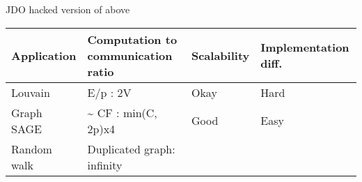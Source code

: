 \documentclass[10pt,oneside]{memoir}
\begin{document}
JDO hacked version of above

\begin{longtable}[]{@{}llll@{}}
\toprule
\begin{minipage}[b]{0.28\columnwidth}\raggedright
Application\strut
\end{minipage} & \begin{minipage}[b]{0.35\columnwidth}\raggedright
Computation to communication ratio\strut
\end{minipage} & \begin{minipage}[b]{0.13\columnwidth}\raggedright
Scalability\strut
\end{minipage} & \begin{minipage}[b]{0.13\columnwidth}\raggedright
Implementation diff.\strut
\end{minipage}\tabularnewline
\midrule
\endhead
\begin{minipage}[t]{0.28\columnwidth}\raggedright
Louvain\strut
\end{minipage} & \begin{minipage}[t]{0.35\columnwidth}\raggedright
E/p : 2V\strut
\end{minipage} & \begin{minipage}[t]{0.13\columnwidth}\raggedright
Okay\strut
\end{minipage} & \begin{minipage}[t]{0.13\columnwidth}\raggedright
Hard\strut
\end{minipage}\tabularnewline
\begin{minipage}[t]{0.28\columnwidth}\raggedright
Graph SAGE\strut
\end{minipage} & \begin{minipage}[t]{0.35\columnwidth}\raggedright
\textasciitilde{} CF : min(C, 2p)x4\strut
\end{minipage} & \begin{minipage}[t]{0.13\columnwidth}\raggedright
Good\strut
\end{minipage} & \begin{minipage}[t]{0.13\columnwidth}\raggedright
Easy\strut
\end{minipage}\tabularnewline
\begin{minipage}[t]{0.28\columnwidth}\raggedright
Random walk\strut
\end{minipage} & \begin{minipage}[t]{0.35\columnwidth}\raggedright
Duplicated graph: infinity\strut
\end{minipage} & \begin{minipage}[t]{0.13\columnwidth}\raggedright

\end{minipage}
\end{longtable}
\end{document}
